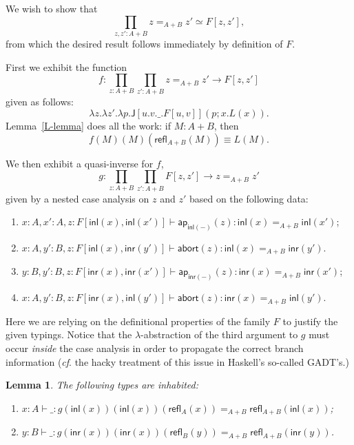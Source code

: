 \documentclass{article}
\newcommand{\abort}[1]{\mathsf{abort}(#1)}
\newcommand{\sumty}[2]{{#1}+{#2}}
\newcommand{\inleft}[1]{\mathsf{inl}(#1)}
\newcommand{\inright}[1]{\mathsf{inr}{(#1)}}
\newcommand{\idty}[3]{{#2}\mathbin{=_{#1}}{#3}}
\newcommand{\refl}[2]{\mathsf{refl}_{#1}({#2})}
\newcommand{\idelim}[4]{\mathsf{J}[{#1}]({#2};{#3}{.}{#4})}
\newcommand{\family}[2]{{#1}.{#2}}
\newcommand{\familytwo}[3]{\family{#1}{\family{#2}{#3}}}
\newcommand{\familythree}[4]{\family{#1}{\familytwo{#2}{#3}{#4}}}
\newcommand{\prodty}[3]{\prod_{{#1}{:}{#2}}{#3}}
\newcommand{\lam}[2]{\lambda {#1}{.}{#2}}
\newcommand{\app}[2]{{#1}({#2})}
\newcommand{\apppath}[1]{\mathsf{ap}_{#1}}
\newtheorem{lemma}[theorem]{Lemma}
\begin{document}
We wish to show that $$\prodty{z,z'}{\sumty{A}{B}}{\idty{\sumty{A}{B}}{z}{z'}}\simeq F[z,z'],$$ from which the desired result follows immediately by definition of $F$.

First we exhibit the function
$$f:\prodty{z}{\sumty{A}{B}}{\prodty{z'}{\sumty{A}{B}}{\idty{\sumty{A}{B}}{z}{z'}\to F[z,z']}}$$
given as follows:
$$\lam{z}{\lam{z'}{\lam{p}{\idelim{\familythree{u}{v}{\_}{F[u,v]}}{p}{x}{\app{L}{x}}}}}.$$
Lemma~\ref{L-lemma} does all the work: if $M:\sumty{A}{B}$, then $$\app{\app{\app{f}{M}}{M}}{\refl{\sumty{A}{B}}{M}}\equiv \app{L}{M}.$$

We then exhibit a quasi-inverse for $f$,
$$g:\prodty{z}{\sumty{A}{B}}{\prodty{z'}{\sumty{A}{B}}{F[z,z']\to\idty{\sumty{A}{B}}{z}{z'}}}$$
given by a nested case analysis on $z$ and $z'$ based on the following data:
\begin{enumerate}
\item $x:A,x':A,z:F[\inleft{x},\inleft{x'}]\vdash \app{\apppath{\inleft{-}}}{z}:\idty{\sumty{A}{B}}{\inleft{x}}{\inleft{x'}}$;
\item $x:A,y':B,z:F[\inleft{x},\inright{y'}]\vdash \abort{z}:\idty{\sumty{A}{B}}{\inleft{x}}{\inright{y'}}$.
\item $y:B,y':B,z:F[\inright{x},\inright{x'}]\vdash \app{\apppath{\inright{-}}}{z}:\idty{\sumty{A}{B}}{\inright{x}}{\inright{x'}}$;
\item $x:A,y':B,z:F[\inright{x},\inleft{y'}]\vdash \abort{z}:\idty{\sumty{A}{B}}{\inright{x}}{\inleft{y'}}$.
\end{enumerate}
Here we are relying on the definitional properties of the family $F$ to justify the given typings.  Notice that the $\lambda$-abstraction of the third argument to $g$ must occur \emph{inside} the case analysis in order to propagate the correct branch information (\textit{cf}. the hacky treatment of this issue in Haskell's so-called GADT's.)

\begin{lemma} 
  \label{g-lemma}
  The following types are inhabited:
  \begin{enumerate}
  \item $x:A\vdash \_ : \idty{\sumty{A}{B}}{\app{\app{\app{g}{\inleft{x}}}{\inleft{x}}}{\refl{A}{x}}}{\refl{\sumty{A}{B}}{\inleft{x}}}$;
  \item $y:B\vdash \_ : \idty{\sumty{A}{B}}{\app{\app{\app{g}{\inright{x}}}{\inright{x}}}{\refl{B}{y}}}{\refl{\sumty{A}{B}}{\inright{y}}}$.
  \end{enumerate}
\end{lemma}
\end{document}
